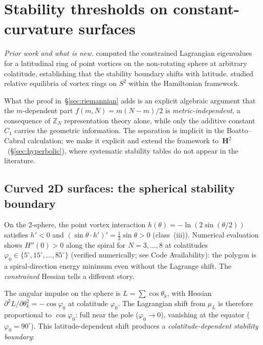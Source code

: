 \section{Stability thresholds on constant-curvature surfaces}
\label{sec:curvature-thresholds}

\noindent\emph{Prior work and what is new.}
\citet{BoattoCabral2003} computed the constrained Lagrangian eigenvalues
for a latitudinal ring of point vortices on the non-rotating sphere at
arbitrary colatitude, establishing that the stability boundary shifts
with latitude.  \citet{LimMontaldiRoberts2001} studied relative
equilibria of vortex rings on $S^2$ within the Hamiltonian framework.


What the proof in~\S\ref{sec:riemannian} adds is an explicit algebraic
argument that the $m$-dependent part $f(m,N) = m(N{-}m)/2$ is
\emph{metric-independent}, a consequence of $\mathbb{Z}_N$
representation theory alone, while only the additive constant $C_1$
carries the geometric information.  The separation is implicit in the
Boatto--Cabral calculation; we make it explicit and extend the framework
to~$\mathbf{H}^2$~(\S\ref{sec:hyperbolic}), where systematic stability
tables do not appear in the literature.

\subsection{Curved 2D surfaces: the spherical stability boundary}
\label{sec:curved}

On the 2-sphere, the point vortex interaction
$h(\theta) = -\ln(2\sin(\theta/2))$ satisfies $h' < 0$ and
$(\sin\theta\cdot h')' = \tfrac12\sin\theta > 0$ (class~(iii)).
Numerical evaluation shows $H''(0) > 0$ along the spiral
for $N = 3,\ldots,8$ at colatitudes $\varphi_0 \in \{5^\circ,
15^\circ, \ldots, 85^\circ\}$
(verified numerically; see Code Availability):
the polygon is a spiral-direction energy minimum even without
the Lagrange shift.  The \emph{constrained} Hessian tells a
different story.

The angular impulse on the sphere is
$L = \sum\cos\theta_k$, with Hessian
$\partial^2 L/\partial\theta_k^2 = -\cos\varphi_0$ at colatitude
$\varphi_0$.  The Lagrangian shift from $\mu_L$ is therefore
proportional to $\cos\varphi_0$: full near the pole ($\varphi_0 \to 0$),
vanishing at the equator ($\varphi_0 = 90^\circ$).  This
latitude-dependent shift produces a \emph{colatitude-dependent
stability boundary}:

